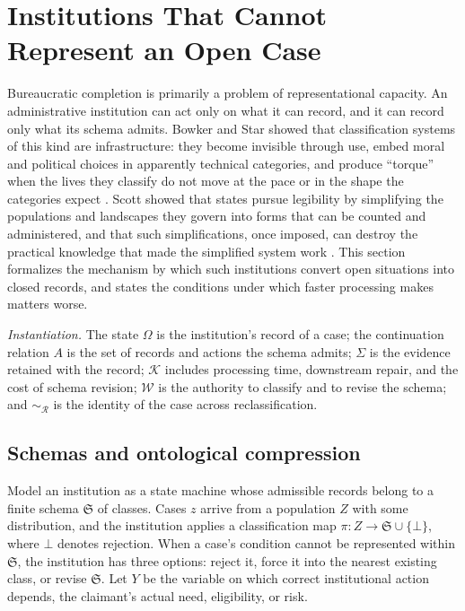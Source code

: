 \section{Institutions That Cannot Represent an Open Case}\label{sec:institutions}

Bureaucratic completion is primarily a problem of representational capacity. An administrative institution can act only on what it can record, and it can record only what its schema admits. Bowker and Star showed that classification systems of this kind are infrastructure: they become invisible through use, embed moral and political choices in apparently technical categories, and produce ``torque'' when the lives they classify do not move at the pace or in the shape the categories expect \cite{bowkerstar1999}. Scott showed that states pursue legibility by simplifying the populations and landscapes they govern into forms that can be counted and administered, and that such simplifications, once imposed, can destroy the practical knowledge that made the simplified system work \cite{scott1998}. This section formalizes the mechanism by which such institutions convert open situations into closed records, and states the conditions under which faster processing makes matters worse.

\emph{Instantiation.} The state $\Omega$ is the institution's record of a case; the continuation relation $A$ is the set of records and actions the schema admits; $\Sigma$ is the evidence retained with the record; $\mathcal{K}$ includes processing time, downstream repair, and the cost of schema revision; $\mathcal{W}$ is the authority to classify and to revise the schema; and $\sim_{\mathcal{R}}$ is the identity of the case across reclassification.

\subsection{Schemas and ontological compression}

Model an institution as a state machine whose admissible records belong to a finite schema $\mathfrak{S}$ of classes. Cases $z$ arrive from a population $Z$ with some distribution, and the institution applies a classification map $\pi:Z\to\mathfrak{S}\cup\{\bot\}$, where $\bot$ denotes rejection. When a case's condition cannot be represented within $\mathfrak{S}$, the institution has three options: reject it, force it into the nearest existing class, or revise $\mathfrak{S}$. Let $Y$ be the variable on which correct institutional action depends, the claimant's actual need, eligibility, or risk.

